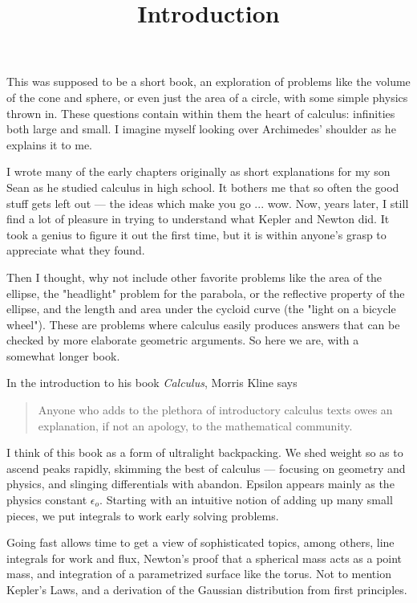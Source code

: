 \documentclass[11pt, oneside]{article}
\title{Introduction}
\date{}
\begin{document}
\maketitle
\Large
This was supposed to be a short book, an exploration of problems like the volume of the cone and sphere, or even just the area of a circle, with some simple physics thrown in.  These questions contain within them the heart of calculus:  infinities both large and small.  I imagine myself looking over Archimedes' shoulder as he explains it to me.

I wrote many of the early chapters originally as short explanations for my son Sean as he studied calculus in high school.  It bothers me that so often the good stuff gets left out --- the ideas which make you go ... wow.  Now, years later, I still find a lot of pleasure in trying to understand what Kepler and Newton did.  It took a genius to figure it out the first time, but it is within anyone's grasp to appreciate what they found.

Then I thought, why not include other favorite problems like the area of the ellipse, the "headlight" problem for the parabola, or the reflective property of the ellipse, and the length and area under the cycloid curve (the "light on a bicycle wheel"). These are problems where calculus easily produces answers that can be checked by more elaborate geometric arguments.  So here we are, with a somewhat longer book.

In the introduction to his book \emph{Calculus}, Morris Kline says
\begin{quote}Anyone who adds to the plethora of introductory calculus texts owes an explanation, if not an apology, to the mathematical community.\end{quote}

I think of this book as a form of ultralight backpacking.  We shed weight so as to ascend peaks rapidly, skimming the best of calculus --- focusing on geometry and physics, and slinging differentials with abandon.  Epsilon appears mainly as the physics constant $\epsilon_o$.  Starting with an intuitive notion of adding up many small pieces, we put integrals to work early solving problems.

Going fast allows time to get a view of sophisticated topics, among others, line integrals for work and flux, Newton's proof that a spherical mass acts as a point mass, and integration of a parametrized surface like the torus.  Not to mention Kepler's Laws, and a derivation of the Gaussian distribution from first principles.
\end{document}
